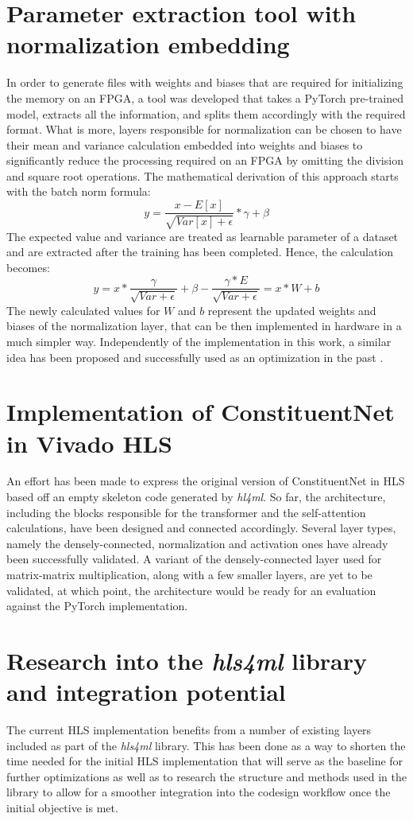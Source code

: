 \section{Parameter extraction tool with normalization embedding}
In order to generate files with weights and biases that are required for initializing the memory on an FPGA, a tool was developed that takes a PyTorch pre-trained model, extracts all the information, and splits them accordingly with the required format. What is more, layers responsible for normalization can be chosen to have their mean and variance calculation embedded into weights and biases to significantly reduce the processing required on an FPGA by omitting the division and square root operations. The mathematical derivation of this approach starts with the batch norm formula:
\[ y = \frac{x - E[x]}{\sqrt{Var[x] + \epsilon}} * \gamma + \beta \]
The expected value and variance are treated as learnable parameter of a dataset and are extracted after the training has been completed. Hence, the calculation becomes:
\[ y = x * \frac{\gamma}{\sqrt{Var + \epsilon}} + \beta - \frac{\gamma * E}{\sqrt{Var + \epsilon}} = x * W + b\]
The newly calculated values for \(W\) and \(b\) represent the updated weights and biases of the normalization layer, that can be then implemented in hardware in a much simpler way. Independently of the implementation in this work, a similar idea has been proposed and successfully used as an optimization in the past \cite{46-fan2018real-time}.
  
\section{Implementation of ConstituentNet in Vivado HLS}
An effort has been made to express the original version of ConstituentNet in HLS based off an empty skeleton code generated by \textit{hl4ml}. So far, the architecture, including the blocks responsible for the transformer and the self-attention calculations, have been designed and connected accordingly. Several layer types, namely the densely-connected, normalization and activation ones have already been successfully validated. A variant of the densely-connected layer used for matrix-matrix multiplication, along with a few smaller layers, are yet to be validated, at which point, the architecture would be ready for an evaluation against the PyTorch implementation.
  
\section{Research into the \textit{hls4ml} library and integration potential}
The current HLS implementation benefits from a number of existing layers included as part of the \textit{hls4ml} library. This has been done as a way to shorten the time needed for the initial HLS implementation that will serve as the baseline for further optimizations as well as to research the structure and methods used in the library to allow for a smoother integration into the codesign workflow once the initial objective is met.